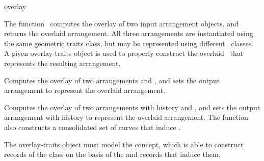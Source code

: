 \ccRefPageBegin

\begin{ccRefFunction}{overlay}

\ccDefinition

The function \ccRefName\ computes the overlay of two input arrangement
objects, and returns the overlaid arrangement. All three arrangements
are instantiated using the same geometric traits class, but may be
represented using different \dcel\ classes. A given overlay-traits object
is used to properly construct the overlaid \dcel\ that represents the
resulting arrangement.



Computes the overlay of two arrangements  and , and sets
the output arrangement  to represent the overlaid arrangement.




Computes the overlay of two arrangements with history  and
, and sets the output arrangement with history  to
represent the overlaid arrangement. The function also constructs a
consolidated set of curves that induce .

The overlay-traits object  must model the 
concept, which is able to construct records of the  class on
the basis of the  and  records that induce them.

\ccSeeAlso

\end{ccRefFunction}

\ccRefPageEnd
